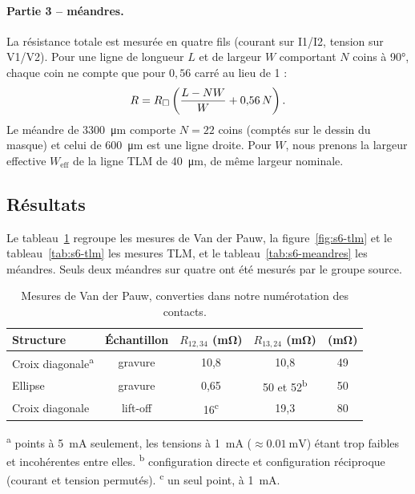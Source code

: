 \paragraph{Partie 3 -- méandres.}
La résistance totale est mesurée en quatre fils (courant sur I1/I2, tension sur V1/V2). Pour une ligne de longueur $L$ et de largeur $W$ comportant $N$ coins à \ang{90}, chaque coin ne compte que pour $0{,}56$ carré au lieu de 1 :
\begin{equation}
  R = R_{\square} \left( \frac{L - N W}{W} + 0{,}56\,N \right) .
  \label{eq:meandre}
\end{equation}
Le méandre de \qty{3300}{\micro\metre} comporte $N = 22$ coins (comptés sur le dessin du masque) et celui de \qty{600}{\micro\metre} est une ligne droite. Pour $W$, nous prenons la largeur effective $W_\text{eff}$ de la ligne TLM de \qty{40}{\micro\metre}, de même largeur nominale.

\subsection{Résultats}

Le tableau~\ref{tab:s6-vdp} regroupe les mesures de Van der Pauw, la figure~\ref{fig:s6-tlm} et le tableau~\ref{tab:s6-tlm} les mesures TLM, et le tableau~\ref{tab:s6-meandres} les méandres. Seuls deux méandres sur quatre ont été mesurés par le groupe source.

\begin{table}[H]
  \centering\footnotesize
  \setlength{\tabcolsep}{4pt}
  \caption{Mesures de Van der Pauw, converties dans notre numérotation des contacts.}
  \label{tab:s6-vdp}
  \begin{tabularx}{\linewidth}{@{}>{\raggedright\arraybackslash}X c c c c@{}}
    \toprule
    \textbf{Structure} & \textbf{Échantillon} & \textbf{$R_{12,34}$ (\unit{\milli\ohm})} & \textbf{$R_{13,24}$ (\unit{\milli\ohm})} & \textbf{\Rsq{} (\unit{\milli\ohm})} \\
    \midrule
    Croix diagonale\textsuperscript{a} & gravure  & 10,8 & 10,8 & 49 \\
    Ellipse                            & gravure  & 0,65 & 50 et 52\textsuperscript{b} & 50 \\
    Croix diagonale                    & lift-off & 16\textsuperscript{c} & 19,3 & 80 \\
    \bottomrule
  \end{tabularx}

  \vspace{2pt}
  {\scriptsize \textsuperscript{a} points à \qty{5}{\milli\ampere} seulement, les tensions à \qty{1}{\milli\ampere} ($\approx \qty{0,01}{\milli\volt}$) étant trop faibles et incohérentes entre elles. \textsuperscript{b} configuration directe et configuration réciproque (courant et tension permutés). \textsuperscript{c} un seul point, à \qty{1}{\milli\ampere}.}
\end{table}


